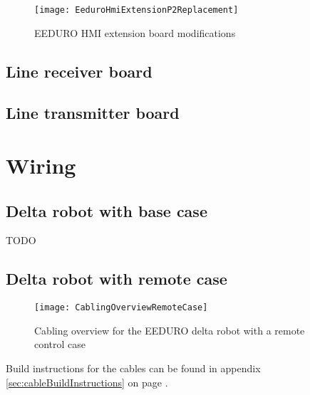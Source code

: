 \begin{figure}[htbp]
	\centering
	\texttt{[image: EeduroHmiExtensionP2Replacement]}
	\caption{EEDURO HMI extension board modifications}
	\label{fig:EeduroHmiExtensionP2Replacement}
\end{figure}

\section{Line receiver board}

\section{Line transmitter board}

\chapter{Wiring}
\section{Delta robot with base case}
TODO

\section{Delta robot with remote case}

\begin{figure}[htbp]
	\centering
	\texttt{[image: CablingOverviewRemoteCase]}
	\caption{Cabling overview for the EEDURO delta robot with a remote control case}
	\label{fig:CablingOverviewRemoteCase}
\end{figure}

Build instructions for the cables can be found in appendix \ref{sec:cableBuildInstructions} on page \pageref{sec:cableBuildInstructions}.

